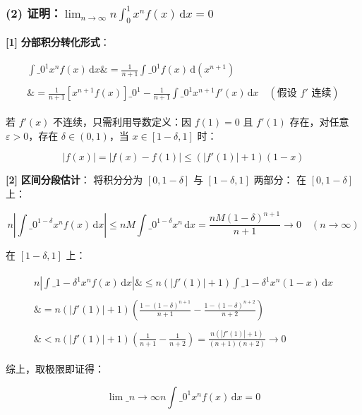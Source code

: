 \documentclass[11pt,a4paper,UTF8]{ctexart}
\begin{document}
\subsubsection{(2) 证明：$\lim_{n \to \infty} n \int_0^1 x^n f(x)\,\mathrm{d}x = 0$}
\begin{solbox}[分步推导与答题规范]
\textbf{[1]}  \textbf{分部积分转化形式}：

\begin{align*}
\begin{aligned}
\int\_0^1 x^n f(x)\,\mathrm{d}x \&= \frac{1}{n+1}\int\_0^1 f(x)\,\mathrm{d}(x^{n+1}) \\ \\
\&= \frac{1}{n+1}\left[ x^{n+1}f(x) \right]\_0^1 - \frac{1}{n+1}\int\_0^1 x^{n+1}f'(x)\,\mathrm{d}x \quad (\text{假设 } f' \text{ 连续})
\end{aligned}
\end{align*}

若 $f'(x)$ 不连续，只需利用导数定义：因 $f(1)=0$ 且 $f'(1)$ 存在，对任意 $\varepsilon > 0$，存在 $\delta \in (0, 1)$，当 $x \in [1-\delta, 1]$ 时：

\begin{equation*}
|f(x)| = |f(x) - f(1)| \le (|f'(1)| + 1)(1-x)
\end{equation*}


\textbf{[2]}  \textbf{区间分段估计}：
将积分分为 $[0, 1-\delta]$ 与 $[1-\delta, 1]$ 两部分：
在 $[0, 1-\delta]$ 上：

\begin{equation*}
n \left| \int\_0^{1-\delta} x^n f(x)\,\mathrm{d}x \right| \le n M \int\_0^{1-\delta} x^n\,\mathrm{d}x = \frac{n M (1-\delta)^{n+1}}{n+1} \to 0 \quad (n \to \infty)
\end{equation*}

在 $[1-\delta, 1]$ 上：

\begin{align*}
\begin{aligned}
n \left| \int\_{1-\delta}^1 x^n f(x)\,\mathrm{d}x \right| \&\le n (|f'(1)|+1) \int\_{1-\delta}^1 x^n (1-x)\,\mathrm{d}x \\ \\
\&= n (|f'(1)|+1) \left( \frac{1-(1-\delta)^{n+1}}{n+1} - \frac{1-(1-\delta)^{n+2}}{n+2} \right) \\ \\
\&< n (|f'(1)|+1) \left( \frac{1}{n+1} - \frac{1}{n+2} \right) = \frac{n (|f'(1)|+1)}{(n+1)(n+2)} \to 0
\end{aligned}
\end{align*}

综上，取极限即证得：

\begin{equation*}
\lim\_{n \to \infty} n \int\_0^1 x^n f(x)\,\mathrm{d}x = 0
\end{equation*}

\end{solbox}
\end{document}
